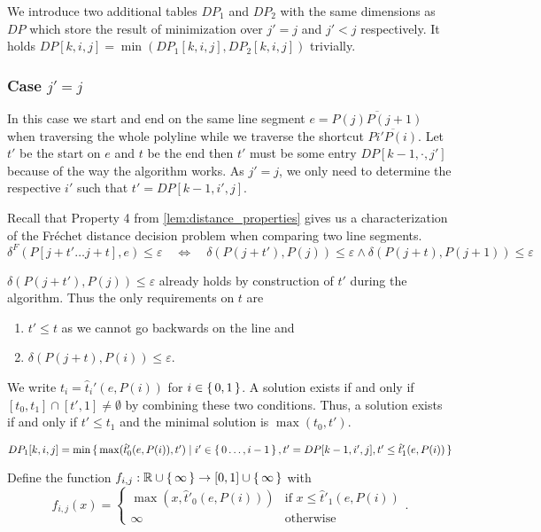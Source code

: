 We introduce two additional tables \(DP_1\) and \(DP_2\) with the same dimensions as \(DP\) which store the result of minimization over \(j'=j\) and \(j' < j\) respectively. It holds \(DP[k, i, j] = \min(DP_1[k,i,j], DP_2[k,i,j])\) trivially. 

\subsubsection{Case \(j' = j\)}

In this case we start and end on the same line segment \(e = \overline{P(j)P(j+1)}\) when traversing the whole polyline while we traverse the shortcut \(\overline{P{i'}P(i)}\). Let \(t'\) be the start on \(e\) and \(t\) be the end then \(t'\) must be some entry \(DP[k-1, \cdot, j']\) because of the way the algorithm works. As \(j' = j\), we only need to determine the respective \(i'\) such that \(t' = DP[k-1, i', j]\).

Recall that Property 4 from \cref{lem:distance_properties} gives us a characterization of the Fréchet distance decision problem when comparing two line segments. 
	\[\delta^F(P[j + t' \dots j + t], e) \leq \varepsilon \quad \iff \quad \delta(P(j+t'), P(j)) \leq \varepsilon \land \delta(P(j+t), P(j+1)) \leq \varepsilon\]
	
\(\delta(P(j+t'), P(j)) \leq \varepsilon\) already holds by construction of \(t'\) during the algorithm. Thus the only requirements on \(t\) are 
\begin{enumerate}
	\item \(t' \leq t\) as we cannot go backwards on the line and 
	\item \(\delta(P(j + t), P(i)) \leq \varepsilon\).  
\end{enumerate}

We write \(t_i = \hat t_i'(e, P(i))\) for \(i \in \set{0, 1}\). A solution exists if and only if \([t_0, t_1] \cap [t', 1] \neq \emptyset\) by combining these two conditions. Thus, a solution exists if and only if \(t' \leq t_1 \) and the minimal solution is \(\max(t_0, t')\). 

\begin{observation}
	\(DP_1[k, i, j] = \min \set{ \max(\hat t'_0(e, P(i)), t') \mid i' \in \set{0 \dots, i - 1}, t' = DP[k-1, i', j], t' \leq \hat t_1'(e, P(i)) }\)
\end{observation}

Define the function \(f_{i,j}: \mathbb{R} \cup \set{\infty} \to [0, 1] \cup \set{\infty}\) with 
	\[f_{i,j}(x) = 
	\begin{cases}
		\max(x, \hat t'_0(e, P(i))) &\textrm{if } x \leq \hat t'_1(e, P(i)) \\
		\infty &\textrm{otherwise}
	\end{cases}.\]
	
